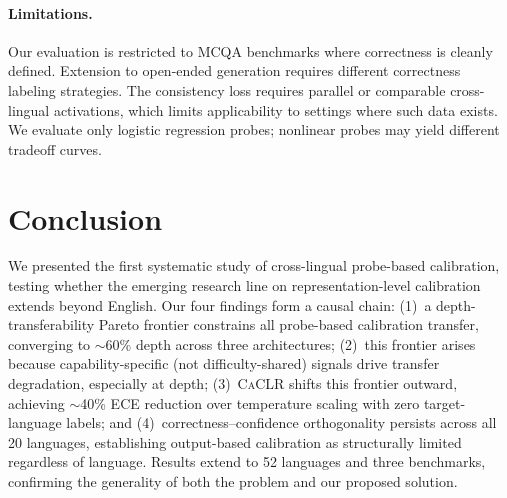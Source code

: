 \documentclass[11pt,a4paper]{article}
\newcommand{\caclr}{\textsc{CaCLR}}
\begin{document}
\paragraph{Limitations.}
Our evaluation is restricted to MCQA benchmarks where correctness is cleanly defined. Extension to open-ended generation requires different correctness labeling strategies. The consistency loss requires parallel or comparable cross-lingual activations, which limits applicability to settings where such data exists. We evaluate only logistic regression probes; nonlinear probes may yield different tradeoff curves.

\section{Conclusion}
\label{sec:conclusion}

We presented the first systematic study of cross-lingual probe-based calibration, testing whether the emerging research line on representation-level calibration extends beyond English. Our four findings form a causal chain: (1)~a depth-transferability Pareto frontier constrains all probe-based calibration transfer, converging to $\sim$60\% depth across three architectures; (2)~this frontier arises because capability-specific (not difficulty-shared) signals drive transfer degradation, especially at depth; (3)~\caclr{} shifts this frontier outward, achieving $\sim$40\% ECE reduction over temperature scaling with zero target-language labels; and (4)~correctness--confidence orthogonality persists across all 20 languages, establishing output-based calibration as structurally limited regardless of language. Results extend to 52 languages and three benchmarks, confirming the generality of both the problem and our proposed solution.

%
%
\end{document}

